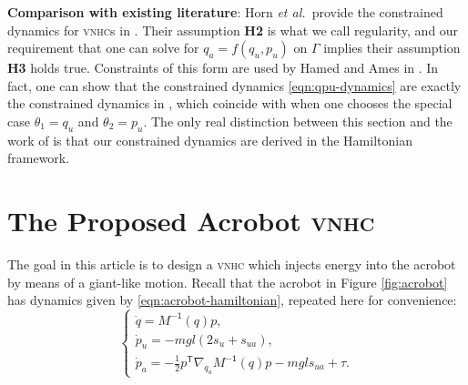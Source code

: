 \documentclass[journal,twoside,web, twocolumn,draftcls]{ieeecolor}
\newtheorem{defn}{Definition} %
\newcommand*{\tpose}{^\mathsf{T}}
\newcommand*{\Minv}{M^\mathsf{-1}}
\newcommand*{\etal}{\MakeLowercase{\textit{et al.~}}}
\newcommand*{\vnhc}{\textsc{vnhc}\xspace}
\newcommand*{\vnhcs}{\textsc{vnhc}s\xspace}
\begin{document}


\textbf{Comparison with existing literature}: Horn \etal provide the constrained
dynamics for \vnhcs in \cite{nhvc_incline_walking}.
Their assumption \textbf{H2} is what we call regularity, and our requirement
that one can solve for \(q_a = f(q_u,p_u)\) on \(\Gamma\) implies their
assumption \textbf{H3} holds true.
Constraints of this form are used by Hamed and Ames in
\cite{nonholonomic_hybrid_zero_dynamics}.
In fact, one can show that the constrained dynamics \eqref{eqn:qpu-dynamics}
are exactly the constrained dynamics in
\cite[Eqn. (9)]{nonholonomic_hybrid_zero_dynamics}, which coincide with 
\cite[Eqn. (17)]{hybrid_zero_dynamics_bipedal_nhvcs}
when one chooses the special case \(\theta_1 = q_u\) and 
\(\theta_2 = p_u\).
The only real distinction between this section and the work of
\cite{nonholonomic_hybrid_zero_dynamics,hybrid_zero_dynamics_bipedal_nhvcs} is
that our constrained dynamics are derived in the Hamiltonian framework. 

\section{The Proposed Acrobot \vnhc}\label{sec:acrobot}

The goal in this article is to design a \vnhc which injects energy into the
acrobot by means of a giant-like motion.
Recall that the acrobot in Figure \ref{fig:acrobot} has dynamics given by
\eqref{eqn:acrobot-hamiltonian}, repeated here for convenience:
    \begin{equation*}
     \begin{cases}
        \dot{q} = \Minv(q) p 
        ,\\
        \dot{p}_u = -mgl\left(2s_u + s_{ua}\right) 
        ,\\
        \dot{p}_a =-\frac{1}{2}p\tpose \nabla_{q_a}\Minv(q) p
        - mgl s_{ua} + \tau.
    \end{cases}
\end{equation*}
\end{document}
